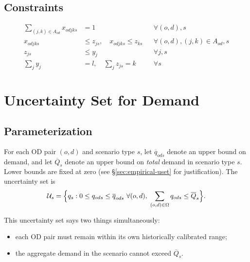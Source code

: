 \documentclass[11pt]{article}
\newcommand{\cU}{\mathcal{U}}
\theoremstyle{definition}
\begin{document}
\subsection{Constraints}

\begin{align}
	\sum_{(j,k)\in A_{od}} x_{odjks} & = 1                                    &  & \forall (o,d), s \label{eq:assign} \\
	x_{odjks}                        & \le z_{js}, \quad x_{odjks} \le z_{ks} &  & \forall (o,d), (j,k)\in A_{od}, s
	\label{eq:active}                                                                                                 \\
	z_{js}                           & \le y_j                                &  & \forall j, s \label{eq:build}      \\
	\sum_j y_j                       & = l, \quad \sum_j z_{js} = k           &  & \forall s \label{eq:budget}
\end{align}

\section{Uncertainty Set for Demand}
\label{sec:uncertainty}

\subsection{Parameterization}

For each OD pair $(o,d)$ and scenario type $s$, let $\overline{q}_{ods}$
denote an upper bound on demand, and let $\overline{Q}_s$ denote an upper bound
on \emph{total} demand in scenario type $s$.  Lower bounds are fixed at zero
(see \S\ref{sec:empirical-uset} for justification).  The uncertainty set is
\begin{equation}
	\cU_s = \Bigl\{
	q_s :
	0 \le q_{ods} \le \overline{q}_{ods}\ \forall (o,d),\;
	\sum_{(o,d)\in\Omega} q_{ods} \le \overline{Q}_s
	\Bigr\}.
	\label{eq:uset}
\end{equation}

This uncertainty set says two things simultaneously:
\begin{itemize}
	\item each OD pair must remain within its own historically calibrated range;
	\item the aggregate demand in the scenario cannot exceed $\overline{Q}_s$.
\end{itemize}
\end{document}
